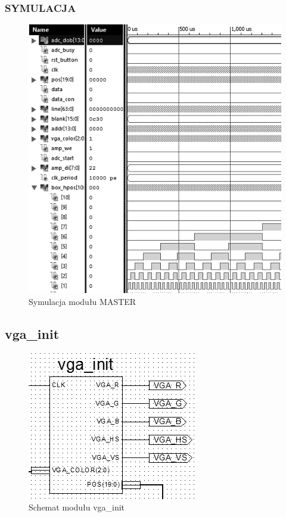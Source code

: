 \documentclass[11pt]{article}
\begin{document}
\subsubsection{SYMULACJA}

\begin{figure}[H]
\center
\includegraphics[scale=1]{master_test1.png}
\caption{Symulacja modułu MASTER}
\end{figure}

\subsection{vga\_init}

\begin{figure}[H]
\center
\includegraphics[scale=1]{VGA_init.png}
\caption{Schemat modułu vga\_init}
\end{figure}
\end{document}
